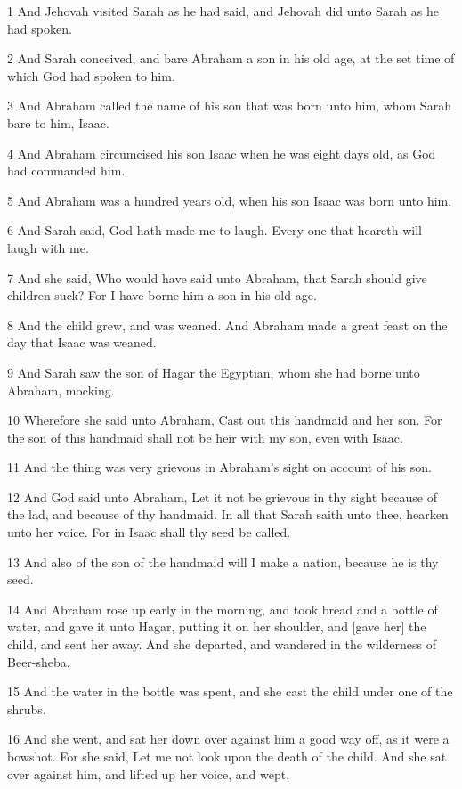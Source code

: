 \par 1 And Jehovah visited Sarah as he had said, and Jehovah did unto Sarah as he had spoken.
\par 2 And Sarah conceived, and bare Abraham a son in his old age, at the set time of which God had spoken to him.
\par 3 And Abraham called the name of his son that was born unto him, whom Sarah bare to him, Isaac.
\par 4 And Abraham circumcised his son Isaac when he was eight days old, as God had commanded him.
\par 5 And Abraham was a hundred years old, when his son Isaac was born unto him.
\par 6 And Sarah said, God hath made me to laugh. Every one that heareth will laugh with me.
\par 7 And she said, Who would have said unto Abraham, that Sarah should give children suck? For I have borne him a son in his old age.
\par 8 And the child grew, and was weaned. And Abraham made a great feast on the day that Isaac was weaned.
\par 9 And Sarah saw the son of Hagar the Egyptian, whom she had borne unto Abraham, mocking.
\par 10 Wherefore she said unto Abraham, Cast out this handmaid and her son. For the son of this handmaid shall not be heir with my son, even with Isaac.
\par 11 And the thing was very grievous in Abraham's sight on account of his son.
\par 12 And God said unto Abraham, Let it not be grievous in thy sight because of the lad, and because of thy handmaid. In all that Sarah saith unto thee, hearken unto her voice. For in Isaac shall thy seed be called.
\par 13 And also of the son of the handmaid will I make a nation, because he is thy seed.
\par 14 And Abraham rose up early in the morning, and took bread and a bottle of water, and gave it unto Hagar, putting it on her shoulder, and [gave her] the child, and sent her away. And she departed, and wandered in the wilderness of Beer-sheba.
\par 15 And the water in the bottle was spent, and she cast the child under one of the shrubs.
\par 16 And she went, and sat her down over against him a good way off, as it were a bowshot. For she said, Let me not look upon the death of the child. And she sat over against him, and lifted up her voice, and wept.
